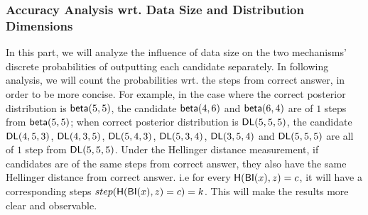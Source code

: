 \documentclass[sigconf]{acmart}
\begin{document}
\subsubsection{Accuracy Analysis wrt. Data Size and Distribution Dimensions}
In this part, we will analyze the influence of data size on the two mechanisms' discrete probabilities of outputting each candidate separately. In following analysis, we will count the probabilities wrt. the steps from correct answer, in order to be more concise. For example, in the case where the correct posterior distribution is $\mathsf{beta}(5,5)$, the candidate $\mathsf{beta}(4,6)$ and $\mathsf{beta}(6,4)$ are of $1$ steps from $\mathsf{beta}(5,5)$; when correct posterior distribution is $\mathsf{DL}(5,5,5)$, the candidate $\mathsf{DL}(4,5,3)$, $\mathsf{DL}(4,3,5)$, $\mathsf{DL}(5,4,3)$, $\mathsf{DL}(5,3,4)$, $\mathsf{DL}(3,5,4)$ and $\mathsf{DL}(5,5,5)$ are all of $1$ step from $\mathsf{DL}(5,5,5)$. Under the Hellinger distance measurement, if candidates are of the same steps from correct answer, they also have the same Hellinger distance from correct answer. i.e for every $\mathsf{H}(\mathsf{BI}(x), z) = c$, it will have a corresponding steps $step(\mathsf{H}(\mathsf{BI}(x), z) = c) = k$. This will make the results more clear and observable.
\end{document}
